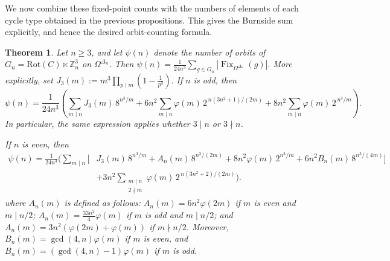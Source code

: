 \documentclass[12pt]{article}
\newtheorem{theorem}{Theorem}[section]
\theoremstyle{definition}
\theoremstyle{remark}
\begin{document}
We now combine these fixed-point counts with the numbers of elements of each cycle type obtained in the previous propositions. This gives the Burnside sum explicitly, and hence the desired orbit-counting formula.
\label{section:numorbits}
\begin{theorem}\label{thm:orbit-formula}
Let $n\geq 3$, and let $\psi(n)$ denote the number of orbits of
$G_n=\mathrm{Rot}(C)\ltimes \mathbb Z_n^3$ on $\Omega^{\Delta_n}$. Then
$\psi(n)=\frac{1}{24n^3}\sum_{g\in G_n}
\left|\operatorname{Fix}_{\Omega^{\Delta_n}}(g)\right|.$
More explicitly, set $
J_3(m):=m^3\prod_{p\mid m}\left(1-\frac{1}{p^3}\right).$
If $n$ is odd, then
\[
\psi(n)
=
\frac{1}{24n^3}
\left(
\sum_{m\mid n} J_3(m)\,8^{n^3/m}
+6n^2\sum_{m\mid n}\varphi(m)\,
2^{\,n(3n^2+1)/(2m)}
+8n^2\sum_{m\mid n}\varphi(m)\,
2^{\,n^3/m}
\right).
\]
In particular, the same expression applies whether $3\mid n$ or
$3\nmid n$.

If $n$ is even, then
\[
\begin{aligned}
\psi(n)
=\frac{1}{24n^3}\Bigg(
\sum_{m\mid n}\Big[
&J_3(m)\,8^{n^3/m}
+A_n(m)\,8^{n^3/(2m)}+8n^2\varphi(m)\,2^{n^3/m}
+6n^2B_n(m)\,8^{n^3/(4m)}
\Big] \\
&+3n^2\sum_{\substack{m\mid n\\2\nmid m}}
\varphi(m)\,2^{\,n(3n^2+2)/(2m)}
\Bigg).
\end{aligned}
\]
where
$A_n(m)$ is defined as follows: $A_n(m)=6n^2\varphi(2m)$ if $m$ is even
and $m\mid n/2$; $A_n(m)=\frac{33n^2}{4}\varphi(m)$ if $m$ is odd and
$m\mid n/2$; and
$A_n(m)=3n^2(\varphi(2m)+\varphi(m))$ if $m\nmid n/2$. Moreover,
$B_n(m)=\gcd(4,n)\varphi(m)$ if $m$ is even, and
$B_n(m)=(\gcd(4,n)-1)\varphi(m)$ if $m$ is odd.
\end{theorem}
\end{document}
